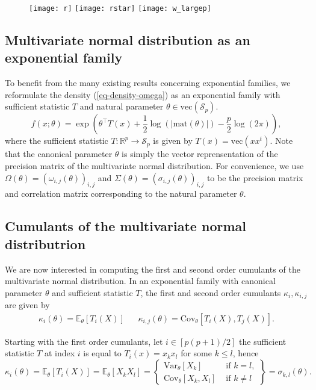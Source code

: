 \begin{figure}[!hbtp]
    \centering
    \texttt{[image: r]}
    \texttt{[image: rstar]}
    \texttt{[image: w\_largep]}
\end{figure}

\newpage


\subsection{Multivariate normal distribution as an exponential family}
To benefit from the many existing results concerning exponential families, we reformulate the density (\ref{eq-density-omega}) as an exponential family with sufficient statistic $T$ and natural parameter $\theta \in \text{vec}(\mathcal{S}_p)$. 
\begin{equation} \label{eq-density-theta}
    f(x; \theta) = \exp\left(\theta^\top T(x) + \frac{1}{2}\log\left(|\text{mat}(\theta)|\right) - \frac{p}{2}\log\left(2\pi\right)\right),
\end{equation}
where the sufficient statistic $T : \mathbb{R}^p \rightarrow \mathcal{S}_p$ is given by $T(x) = \text{vec}(xx^t)$. Note that the canonical parameter $\theta$ is simply the vector reprensentation of the precision matrix of the multivariate normal distribution. For convenience, we use $\Omega(\theta) = (\omega_{i,j}(\theta))_{i,j}$ and $\Sigma(\theta) = (\sigma_{i,j}(\theta))_{i,j}$ to be the precision matrix and correlation matrix corresponding to the natural parameter $\theta$.

\subsection{Cumulants of the multivariate normal distributrion}

We are now interested in computing the first and second order cumulants of the multivariate normal distribution. In an exponential family with canonical parameter $\theta$ and sufficient statistic $T$, the first and second order cumulants $\kappa_i, \kappa_{i, j}$ are given by
\begin{align*}
    \kappa_i(\theta) = \mathbb{E}_\theta\left[T_i(X)\right] && \kappa_{i,j}(\theta) = \text{Cov}_\theta\left[T_i(X), T_j(X)\right].
\end{align*}

Starting with the first order cumulants, let $i \in [p(p+1)/2]$ the sufficient statistic $T$ at index $i$ is equal to $T_i(x) = x_kx_l$ for some $k \leq l$, hence
\begin{equation*}
    \kappa_i(\theta) 
    = \mathbb{E}_\theta\left[T_i(X)\right]
    = \mathbb{E}_\theta\left[X_kX_l  \right]
    = \left\{
        \begin{array}{cc}
            \text{Var}_\theta[X_k]      & \text{ if } k = l,\\
            \text{Cov}_\theta[X_k, X_l] & \text{ if } k \neq l
        \end{array}
    \right\}
    = \sigma_{k, l}(\theta).
\end{equation*}

